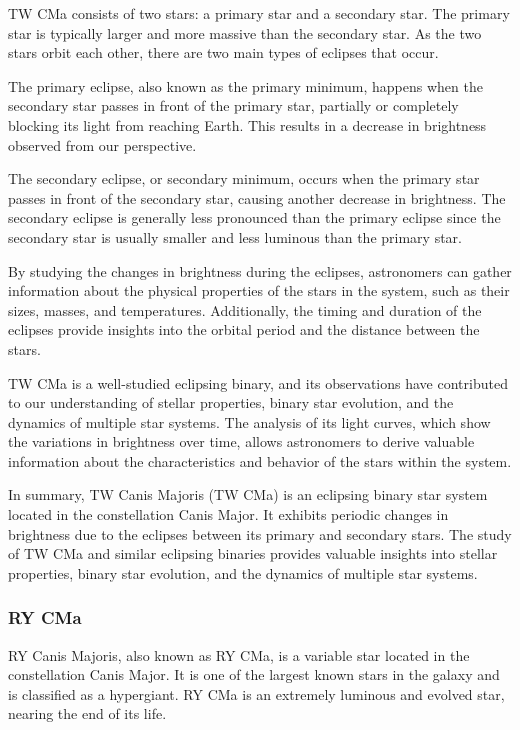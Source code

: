 TW CMa consists of two stars: a primary star and a secondary star. The primary star is typically larger and more massive than the secondary star. As the two stars orbit each other, there are two main types of eclipses that occur.

The primary eclipse, also known as the primary minimum, happens when the secondary star passes in front of the primary star, partially or completely blocking its light from reaching Earth. This results in a decrease in brightness observed from our perspective.

The secondary eclipse, or secondary minimum, occurs when the primary star passes in front of the secondary star, causing another decrease in brightness. The secondary eclipse is generally less pronounced than the primary eclipse since the secondary star is usually smaller and less luminous than the primary star.

By studying the changes in brightness during the eclipses, astronomers can gather information about the physical properties of the stars in the system, such as their sizes, masses, and temperatures. Additionally, the timing and duration of the eclipses provide insights into the orbital period and the distance between the stars.

TW CMa is a well-studied eclipsing binary, and its observations have contributed to our understanding of stellar properties, binary star evolution, and the dynamics of multiple star systems. The analysis of its light curves, which show the variations in brightness over time, allows astronomers to derive valuable information about the characteristics and behavior of the stars within the system.

In summary, TW Canis Majoris (TW CMa) is an eclipsing binary star system located in the constellation Canis Major. It exhibits periodic changes in brightness due to the eclipses between its primary and secondary stars. The study of TW CMa and similar eclipsing binaries provides valuable insights into stellar properties, binary star evolution, and the dynamics of multiple star systems.

\subsubsection*{ RY CMa }

RY Canis Majoris, also known as RY CMa, is a variable star located in the constellation Canis Major. It is one of the largest known stars in the galaxy and is classified as a hypergiant. RY CMa is an extremely luminous and evolved star, nearing the end of its life.

